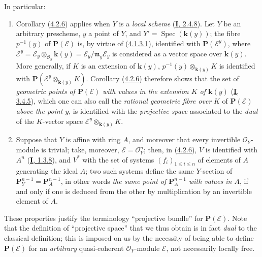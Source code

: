 
In particular:
\begin{enumerate}
  \item[1\textsuperscript{o}] Corollary
  (\hyperref[II.4.2.6]{4.2.6}) applies when $Y$ is a
  \emph{local scheme} (\hyperref[I.2.4.8]{\textbf{I}, 2.4.8}). Let $Y$ be an
  arbitrary prescheme, $y$ a point of $Y$, and
  $Y'=\operatorname{Spec}(\boldsymbol{k}(y))$; the fibre $p^{-1}(y)$ of
  $\mathbf{P}(\mathcal{E})$ is, by virtue of
  (\hyperref[II.4.1.3.1]{4.1.3.1}), identified with
  $\mathbf{P}(\mathcal{E}^y)$, where
  $\mathcal{E}^y=\mathcal{E}_y\otimes_{\mathcal{O}_y}\boldsymbol{k}(y)
  =\mathcal{E}_y/\mathfrak{m}_y\mathcal{E}_y$ is considered as a vector
  space over $\boldsymbol{k}(y)$. More generally, if $K$ is an extension of
  $\boldsymbol{k}(y)$, $p^{-1}(y)\otimes_{\boldsymbol{k}(y)}K$ is identified with
  $\mathbf{P}(\mathcal{E}^y\otimes_{\boldsymbol{k}(y)}K)$. Corollary
  (\hyperref[II.4.2.6]{4.2.6}) therefore shows that the set of
  \emph{geometric points of $\mathbf{P}(\mathcal{E})$ with values in
  the extension $K$ of $\boldsymbol{k}(y)$} (\hyperref[I.3.4.5]{\textbf{I}, 3.4.5}), which one
  can also call the \emph{rational geometric fibre over} $K$ of
  $\mathbf{P}(\mathcal{E})$ \emph{above the point $y$}, is identified with
  the \emph{projective space} associated to the \emph{dual} of the $K$-vector
  space $\mathcal{E}^y\otimes_{\boldsymbol{k}(y)}K$.
  \item[2\textsuperscript{o}] Suppose that $Y$ is affine with ring $A$, and
  moreover that every invertible $\mathcal{O}_Y$-module is trivial; take,
  moreover, $\mathcal{E}=\mathcal{O}_Y^n$; then, in
  (\hyperref[II.4.2.6]{4.2.6}), $V$ is identified with $A^n$
  (\hyperref[I.1.3.8]{\textbf{I}, 1.3.8}), and $V^*$ with the set of systems
  $(f_i)_{1\leq i\leq n}$ of elements of $A$ generating the ideal $A$; two
  such systems define the same $Y$-section of
  $\mathbf{P}_Y^{n-1}=\mathbf{P}_A^{n-1}$, in other words \emph{the same point of
  $\mathbf{P}_A^{n-1}$ with values in $A$}, if and only if one is deduced
  from the other by multiplication by an invertible element of $A$.
\end{enumerate}

These properties justify the terminology ``projective bundle'' for
$\mathbf{P}(\mathcal{E})$. Note that the definition of ``projective
space'' that we thus obtain is in fact \emph{dual} to the classical
definition; this is imposed on us by the necessity of being able to define
$\mathbf{P}(\mathcal{E})$ for an \emph{arbitrary} quasi-coherent $\mathcal{O}_Y$-module
$\mathcal{E}$, not necessarily locally free.

